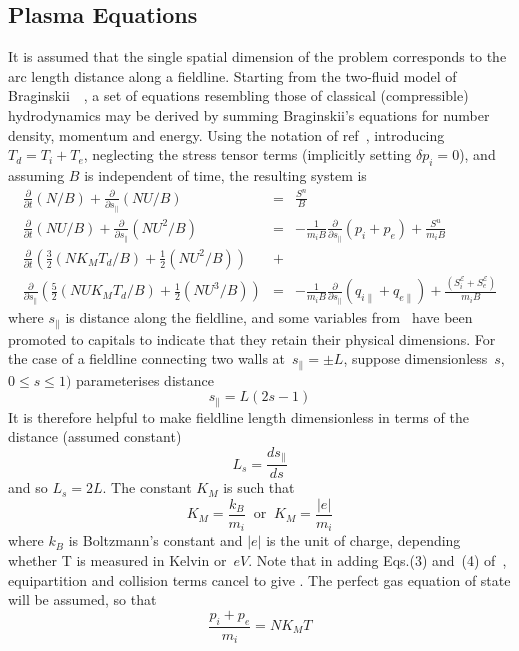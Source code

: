 \subsection{Plasma Equations}\label{sec:sys23plas}
It is assumed that the single spatial dimension of the problem
corresponds to the arc length distance along a fieldline.
Starting from the two-fluid model of Braginskii~~\cite{Br65Tranwarv},
a set of equations resembling those of classical (compressible) hydrodynamics
may be derived by summing Braginskii's equations for number density,
momentum and energy.
Using the notation of ref~\cite{Ha13Benc}, introducing $T_d=T_i+T_e$,
neglecting the stress tensor terms (implicitly setting $\delta p_i=0$),
and assuming $B$ is independent of time, the resulting system is
\begin{eqnarray}\label{eq:sysn1}
\frac{\partial}{\partial t} (N/B)+ 
\frac{\partial}{\partial s_{\|}} (N U/B)&=&\frac{S^n}{B} \\
\frac{\partial}{\partial t} (N U/B)+ 
\frac{\partial}{\partial s_{\|}} (N U^2/B)&=&
-\frac{1}{m_i B}\frac{\partial}{\partial s_{\|}} (p_i + p_e) +\frac{S^u}{m_i B} \label{eq:sysu1}\\
\frac{\partial}{\partial t}\left( \frac{3}{2}(N K_M T_d/B)+
\frac{1}{2} (N U^2/B) \right) &+& \nonumber \\
\frac{\partial}{\partial s_{\|}} \left( \frac{5}{2}(N U K_M T_d/B) +
\frac{1}{2} (N U^3/B) \right) &=&
-\frac{1}{m_i B}\frac{\partial}{\partial s_{\|}} (q_{i\|} + q_{e\|}) +
\frac{(S_i^\mathcal{E}+S_e^\mathcal{E})}{m_i B} \label{eq:syst1}
\end{eqnarray}
where $s_{\|}$ is distance along the fieldline,
and some variables from~\cite{Ha13Benc} have been promoted to capitals to 
indicate that they retain their physical dimensions.
For the case of a fieldline connecting two walls at~$s_{\|}=\pm L$,
suppose dimensionless~$s$, $0\leq s\leq 1)$ parameterises distance
\begin{equation}\label{eq:spar}
s_{\|}=L(2s-1)
\end{equation}
It is therefore helpful to make fieldline length dimensionless in terms of the distance
(assumed constant)
\begin{equation}\label{eq:hs}
L_s= \frac{d s_{\|}}{d  s}
\end{equation}
and so $L_s=2L$.
The constant $K_M$ is such that
\begin{equation}
K_M= \frac{k_B}{m_i}\;\;\mbox{or}\;\;K_M=\frac{|e|}{m_i}
\end{equation}
where $k_B$ is Boltzmann's constant and $|e|$ is the unit of charge,
depending whether T is measured in Kelvin or~$eV$. 
Note that in adding Eqs.(3) and~(4) of~\cite{Ha13Benc}, equipartition and collision terms cancel 
to give . The perfect gas equation of state will be assumed, so that
\begin{equation}\label{eq:sysp}
\frac{p_i+p_e}{m_i}=N K_M T
\end{equation}


